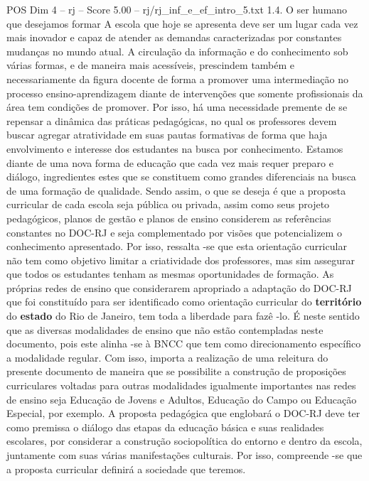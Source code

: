 \begin{textsample}{POS Dim 4 – rj – Score 5.00 – rj/rj\_inf\_e\_ef\_intro\_5.txt}  \label{ex:f4_pos_170}
1.4.
O ser humano que desejamos formar A escola que hoje se apresenta deve ser um lugar cada vez mais inovador e capaz de atender as demandas caracterizadas por constantes mudanças no mundo atual.
A circulação da informação e do conhecimento sob várias formas, e de maneira mais acessíveis, prescindem também e necessariamente da figura docente de forma a promover uma intermediação no processo ensino-aprendizagem diante de intervenções que somente profissionais da área tem condições de promover.
Por isso, há uma necessidade premente de se repensar a dinâmica das práticas pedagógicas, no qual os professores devem buscar agregar atratividade em suas pautas formativas de forma que haja envolvimento e interesse dos estudantes na busca por conhecimento.
Estamos diante de uma nova forma de educação que cada vez mais requer preparo e diálogo, ingredientes estes que se constituem como grandes diferenciais na busca de uma formação de qualidade.
Sendo assim, o que se deseja é que a proposta curricular de cada escola seja pública ou privada, assim como seus projeto pedagógicos, planos de gestão e planos de ensino considerem as referências constantes no DOC-RJ e seja complementado por visões que potencializem o conhecimento apresentado.
Por isso, ressalta -se que esta orientação curricular não tem como objetivo limitar a criatividade dos professores, mas sim assegurar que todos os estudantes tenham as mesmas oportunidades de formação.
As próprias redes de ensino que considerarem apropriado a adaptação do DOC-RJ que foi constituído para ser identificado como orientação curricular do \textbf{território} do \textbf{estado} do Rio de Janeiro, tem toda a liberdade para fazê -lo.
É neste sentido que as diversas modalidades de ensino que não estão contempladas neste documento, pois este alinha -se à BNCC que tem como direcionamento específico a modalidade regular.
Com isso, importa a realização de uma releitura do presente documento de maneira que se possibilite a construção de proposições curriculares voltadas para outras modalidades igualmente importantes nas redes de ensino seja Educação de Jovens e Adultos, Educação do Campo ou Educação Especial, por exemplo.
A proposta pedagógica que englobará o DOC-RJ deve ter como premissa o diálogo das etapas da educação básica e suas realidades escolares, por considerar a construção sociopolítica do entorno e dentro da escola, juntamente com suas várias manifestações culturais.
Por isso, compreende -se que a proposta curricular definirá a sociedade que teremos.

\end{textsample}
